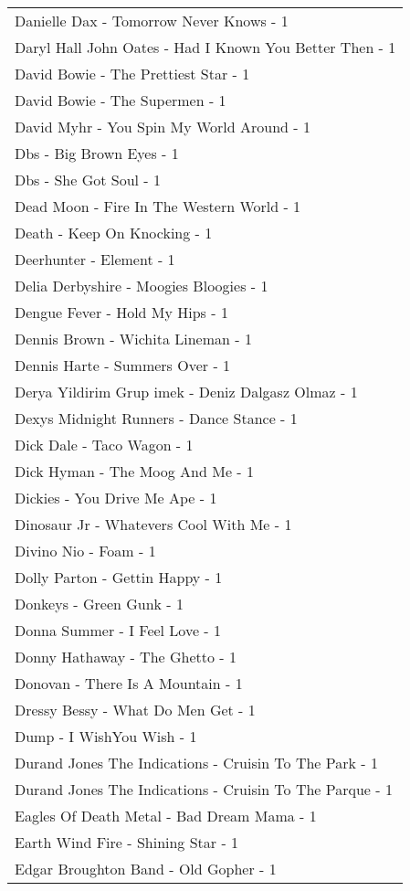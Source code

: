 \documentclass[
]{article}
\begin{document}
\begin{longtable}{l}
Danielle Dax - Tomorrow Never Knows - 1 \\ 
Daryl Hall John Oates - Had I Known You Better Then - 1 \\ 
David Bowie - The Prettiest Star - 1 \\ 
David Bowie - The Supermen - 1 \\ 
David Myhr - You Spin My World Around - 1 \\ 
Dbs - Big Brown Eyes - 1 \\ 
Dbs - She Got Soul - 1 \\ 
Dead Moon - Fire In The Western World - 1 \\ 
Death - Keep On Knocking - 1 \\ 
Deerhunter - Element - 1 \\ 
Delia Derbyshire - Moogies Bloogies - 1 \\ 
Dengue Fever - Hold My Hips - 1 \\ 
Dennis Brown - Wichita Lineman - 1 \\ 
Dennis Harte - Summers Over - 1 \\ 
Derya Yildirim Grup imek - Deniz Dalgasz Olmaz - 1 \\ 
Dexys Midnight Runners - Dance Stance - 1 \\ 
Dick Dale - Taco Wagon - 1 \\ 
Dick Hyman - The Moog And Me - 1 \\ 
Dickies - You Drive Me Ape - 1 \\ 
Dinosaur Jr - Whatevers Cool With Me - 1 \\ 
Divino Nio - Foam - 1 \\ 
Dolly Parton - Gettin Happy - 1 \\ 
Donkeys - Green Gunk - 1 \\ 
Donna Summer - I Feel Love - 1 \\ 
Donny Hathaway - The Ghetto - 1 \\ 
Donovan - There Is A Mountain - 1 \\ 
Dressy Bessy - What Do Men Get - 1 \\ 
Dump - I WishYou Wish - 1 \\ 
Durand Jones The Indications - Cruisin To The Park - 1 \\ 
Durand Jones The Indications - Cruisin To The Parque - 1 \\ 
Eagles Of Death Metal - Bad Dream Mama - 1 \\ 
Earth Wind Fire - Shining Star - 1 \\ 
Edgar Broughton Band - Old Gopher - 1 \\ 

\end{longtable}
\end{document}
